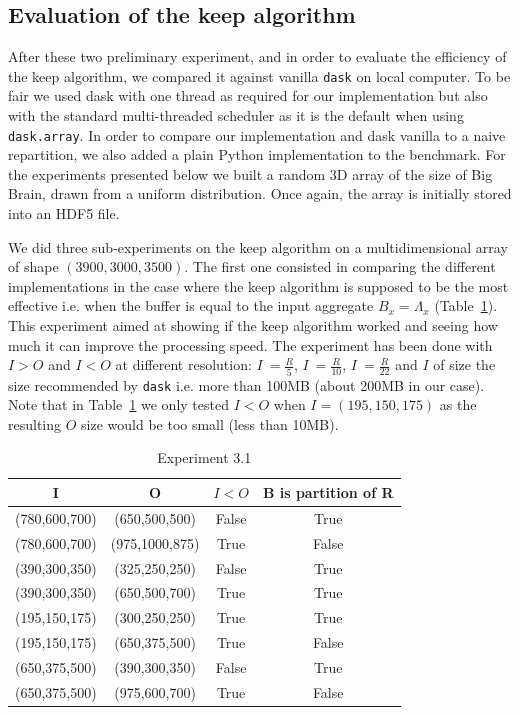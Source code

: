 \documentclass[conference]{IEEEtran}
\begin{document}
\subsection{Evaluation of the keep algorithm}
After these two preliminary experiment, and in order to evaluate the
efficiency of the keep algorithm, we compared it against vanilla \texttt{dask}
on local computer. To be fair we used dask with one thread as required for our
implementation but also with the standard multi-threaded scheduler as it is the
default when using \texttt{dask.array}. In order to compare our implementation
and dask vanilla to a naive repartition, we also added a plain Python implementation
to the benchmark. For the experiments presented below we built a random 3D array
 of the size of Big Brain, drawn from a uniform distribution. Once again, the
 array is initially stored into an HDF5 file.

We did three sub-experiments on the keep algorithm on a multidimensional array
of shape $(3900,3000,3500)$. The first one consisted in comparing the different
implementations in the case where the keep algorithm is supposed to be the most
effective i.e. when the buffer is equal to the input aggregate $B_x=\Lambda_x$
(Table~\ref{tab:exp3_1}). This experiment aimed at showing if the keep
algorithm worked and seeing how much it can improve the processing speed.
The experiment has been done with $I>O$ and $I<O$ at different resolution:
$I~=\frac{R}{5}$, $I~=\frac{R}{10}$, $I~=\frac{R}{22}$ and $I$ of size the size
recommended by \texttt{dask} i.e. more than 100MB (about 200MB in our case).
Note that in Table~\ref{tab:exp3_1} we only tested $I<O$ when $I=(195,150,175)$
as the resulting $O$ size would be too small (less than 10MB).

\begin{table}[ht]
 \centering
 \caption{Experiment 3.1}

  \begin{tabular}[t]{c c c c}
  \hline
    I & O & $I<O$ & B is partition of R \\
    \hline\hline
    (780,600,700) & (650,500,500) & False & True \\
    \hline
    (780,600,700) & (975,1000,875) & True & False \\
    \hline
    (390,300,350) & (325,250,250) & False & True \\
    \hline
    (390,300,350) & (650,500,700) & True & True \\
    \hline
    (195,150,175) & (300,250,250) & True & True \\
    \hline
    (195,150,175) & (650,375,500) & True & False \\
    \hline
    (650,375,500) & (390,300,350) & False & True \\
    \hline
    (650,375,500) & (975,600,700) & True & False \\
    \hline
  \end{tabular}

  \label{tab:exp3_1}
\end{table}
\end{document}
